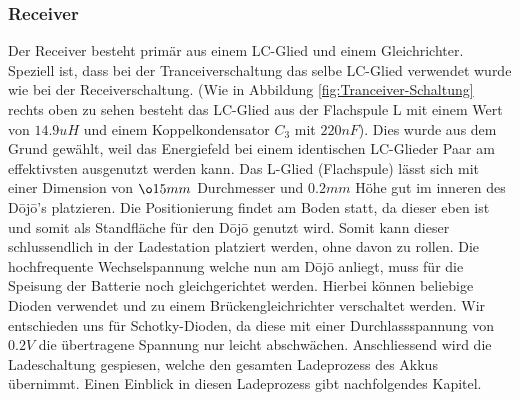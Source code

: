 \subsubsection*{Receiver}
Der Receiver besteht primär aus einem LC-Glied und einem Gleichrichter. Speziell ist, dass bei der Tranceiverschaltung das selbe LC-Glied verwendet wurde wie bei der Receiverschaltung. (Wie in Abbildung \ref{fig:Tranceiver-Schaltung} rechts oben zu sehen besteht das LC-Glied aus der Flachspule L mit einem Wert von $14.9uH$ und einem Koppelkondensator $C_{3}$ mit $220nF$). Dies wurde aus dem Grund gewählt, weil das Energiefeld bei einem identischen LC-Glieder Paar am effektivsten ausgenutzt werden kann. Das L-Glied (Flachspule) lässt sich mit einer Dimension von $\o 15mm$ Durchmesser und $0.2mm$ Höhe gut im inneren des Dōjō’s platzieren. Die Positionierung findet am Boden statt, da dieser eben ist und somit als Standfläche für den Dōjō genutzt wird. Somit kann dieser schlussendlich in der Ladestation platziert werden, ohne davon zu rollen. Die hochfrequente Wechselspannung welche nun am Dōjō anliegt, muss für die Speisung der Batterie noch gleichgerichtet werden. Hierbei können beliebige Dioden verwendet und zu einem Brückengleichrichter verschaltet werden. Wir entschieden uns für Schotky-Dioden, da diese mit einer Durchlassspannung von $0.2V$ die übertragene Spannung nur leicht abschwächen. Anschliessend wird die Ladeschaltung gespiesen, welche den gesamten Ladeprozess des Akkus übernimmt. Einen Einblick in diesen Ladeprozess gibt nachfolgendes Kapitel.

